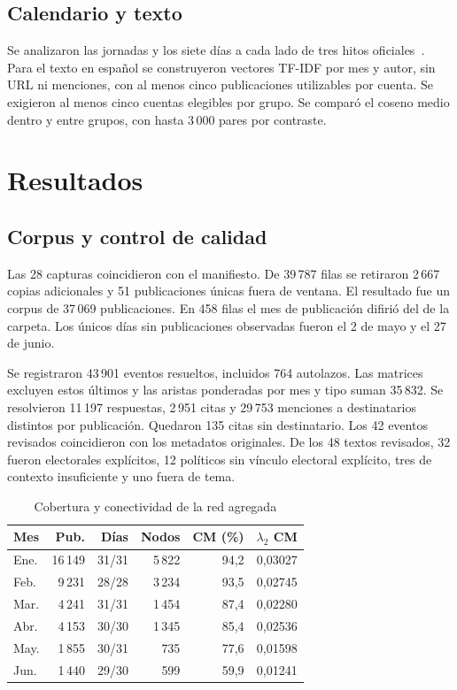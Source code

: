 \documentclass[journal]{IEEEtran}
\begin{document}
\subsection{Calendario y texto}
Se analizaron las jornadas y los siete días a cada lado de tres hitos oficiales~\cite{registraduria}. Para el texto en español se construyeron vectores TF-IDF por mes y autor, sin URL ni menciones, con al menos cinco publicaciones utilizables por cuenta. Se exigieron al menos cinco cuentas elegibles por grupo. Se comparó el coseno medio dentro y entre grupos, con hasta 3\,000 pares por contraste.

\section{Resultados}
\subsection{Corpus y control de calidad}
Las 28 capturas coincidieron con el manifiesto. De 39\,787 filas se retiraron 2\,667 copias adicionales y 51 publicaciones únicas fuera de ventana. El resultado fue un corpus de 37\,069 publicaciones. En 458 filas el mes de publicación difirió del de la carpeta. Los únicos días sin publicaciones observadas fueron el 2 de mayo y el 27 de junio.

Se registraron 43\,901 eventos resueltos, incluidos 764 autolazos. Las matrices excluyen estos últimos y las aristas ponderadas por mes y tipo suman 35\,832. Se resolvieron 11\,197 respuestas, 2\,951 citas y 29\,753 menciones a destinatarios distintos por publicación. Quedaron 135 citas sin destinatario. Los 42 eventos revisados coincidieron con los metadatos originales. De los 48 textos revisados, 32 fueron electorales explícitos, 12 políticos sin vínculo electoral explícito, tres de contexto insuficiente y uno fuera de tema.

\begin{table}[t]
\centering
\caption{Cobertura y conectividad de la red agregada}
\label{tab:mensual}
\begin{tabular}{lrrrrr}
\toprule
Mes & Pub. & Días & Nodos & CM (\%) & $\lambda_2$ CM\\
\midrule
Ene. & 16\,149 & 31/31 & 5\,822 & 94,2 & 0,03027\\
Feb. & 9\,231 & 28/28 & 3\,234 & 93,5 & 0,02745\\
Mar. & 4\,241 & 31/31 & 1\,454 & 87,4 & 0,02280\\
Abr. & 4\,153 & 30/30 & 1\,345 & 85,4 & 0,02536\\
May. & 1\,855 & 30/31 & 735 & 77,6 & 0,01598\\
Jun. & 1\,440 & 29/30 & 599 & 59,9 & 0,01241\\
\bottomrule
\end{tabular}
\end{table}
\end{document}
